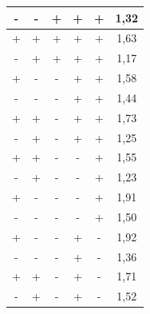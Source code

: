 \documentclass[
12pt,					%
openright,				%
oneside,				%
a4paper,				%
english,
brazil
]{ABNT/abntex2_report}
\begin{document}
\begin{table}[H]
\begin{tabular}{|c|c|c|c|c|c|}
	\rowcolor[HTML]{EFEFEF} 
	-              & -               & +                & +                 & +                  & 1,32           \\ \hline
	+              & +               & +                & +                 & +                  & 1,63           \\ \hline
	\rowcolor[HTML]{EFEFEF} 
	-              & +               & +                & +                 & +                  & 1,17           \\ \hline
	+              & -               & -                & +                 & +                  & 1,58           \\ \hline
	\rowcolor[HTML]{EFEFEF} 
	-              & -               & -                & +                 & +                  & 1,44           \\ \hline
	+              & +               & -                & +                 & +                  & 1,73           \\ \hline
	\rowcolor[HTML]{EFEFEF} 
	-              & +               & -                & +                 & +                  & 1,25           \\ \hline
	+              & +               & -                & -                 & +                  & 1,55           \\ \hline
	\rowcolor[HTML]{EFEFEF} 
	-              & +               & -                & -                 & +                  & 1,23           \\ \hline
	+              & -               & -                & -                 & +                  & 1,91           \\ \hline
	\rowcolor[HTML]{EFEFEF} 
	-              & -               & -                & -                 & +                  & 1,50           \\ \hline
	+              & -               & -                & +                 & -                  & 1,92           \\ \hline
	\rowcolor[HTML]{EFEFEF} 
	-              & -               & -                & +                 & -                  & 1,36           \\ \hline
	+              & +               & -                & +                 & -                  & 1,71           \\ \hline
	\rowcolor[HTML]{EFEFEF} 
	-              & +               & -                & +                 & -                  & 1,52           \\ \hline

\end{tabular}
\end{table}
\end{document}
